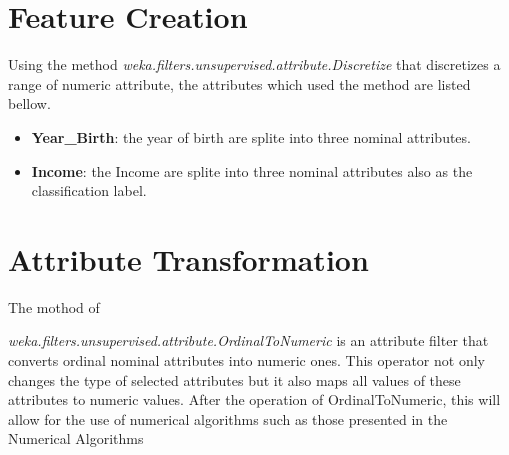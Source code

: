 \section{Feature Creation}
Using the method \textit{weka.filters.unsupervised.attribute.Discretize} that discretizes a range of numeric attribute, the attributes which used the method are listed bellow.
\begin{itemize}
    \item \textbf{Year\_Birth}: the year of birth are splite into three nominal attributes.
    \item \textbf{Income}: the Income are splite into three nominal attributes also as the classification label.
\end{itemize}


\section{Attribute Transformation}
The mothod of 

\textit{weka.filters.unsupervised.attribute.OrdinalToNumeric} is an attribute filter that converts ordinal nominal attributes into numeric ones. This operator not only changes the type of selected attributes but it also maps all values of these attributes to numeric values. 
After the operation of OrdinalToNumeric, this will allow for the use of numerical algorithms such as those presented in the Numerical Algorithms


